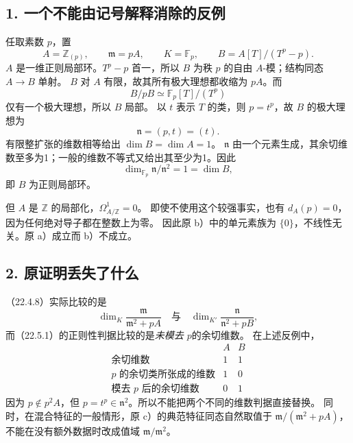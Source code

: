 \documentclass[UTF8,a4paper]{ctexbook}
\begin{document}
\subsection*{1. 一个不能由记号解释消除的反例}
任取素数 $p$，置
\[
 A=\mathbb Z_{(p)},\qquad\mathfrak m=pA,\qquad K=\mathbb F_p,
 \qquad B=A[T]/(T^p-p).
\]
$A$ 是一维正则局部环。$T^p-p$ 首一，所以 $B$ 为秩 $p$ 的自由 $A$-模；结构同态 $A\to B$ 单射。
$B$ 对 $A$ 有限，故其所有极大理想都收缩为 $pA$。而
\[
 B/pB\simeq\mathbb F_p[T]/(T^p)
\]
仅有一个极大理想，所以 $B$ 局部。
以 $t$ 表示 $T$ 的类，则 $p=t^p$，故 $B$ 的极大理想为
\[
 \mathfrak n=(p,t)=(t).
\]
有限整扩张的维数相等给出 $\dim B=\dim A=1$。
$\mathfrak n$ 由一个元素生成，其余切维数至多为1；一般的维数不等式又给出其至少为1。因此
\[
 \dim_{\mathbb F_p}\mathfrak n/\mathfrak n^2=1=\dim B,
\]
即 $B$ 为正则局部环。

但 $A$ 是 $\mathbb Z$ 的局部化，$\Omega^1_{A/\mathbb Z}=0$。
即使不使用这个较强事实，也有 $d_A(p)=0$，因为任何绝对导子都在整数上为零。
因此原 b）中的单元素族为 $\{0\}$，不线性无关。原 a）成立而 b）不成立。

\subsection*{2. 原证明丢失了什么}
（22.4.8）实际比较的是
\[
 \dim_K\frac{\mathfrak m}{\mathfrak m^2+pA}
 \quad\text{与}\quad
 \dim_{K'}\frac{\mathfrak n}{\mathfrak n^2+pB},
\]
而（22.5.1）的正则性判据比较的是\emph{未模去 $p$}的余切维数。
在上述反例中，
\[
 \begin{array}{c|cc}
 &A&B\\\hline
 \text{余切维数}&1&1\\
 p\text{ 的余切类所张成的维数}&1&0\\
 \text{模去 }p\text{ 后的余切维数}&0&1
 \end{array}
\]
因为 $p\notin p^2A$，但 $p=t^p\in\mathfrak n^2$。所以不能把两个不同的维数判据直接替换。
同时，在混合特征的一般情形，原 c）的典范特征同态自然取值于
$\mathfrak m/(\mathfrak m^2+pA)$，不能在没有额外数据时改成值域 $\mathfrak m/\mathfrak m^2$。
\end{document}
